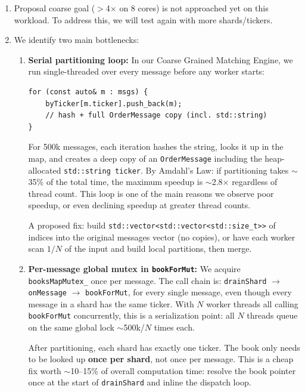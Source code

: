 \documentclass[11pt]{article}
\begin{document}
\begin{enumerate}
    \item Proposal coarse goal ($>$4$\times$ on 8 cores) is not approached yet on this workload. To address this, we will test again with more shards/tickers.

    \item We identify two main bottlenecks:

    \begin{enumerate}[label=\alph*)]
        \item \textbf{Serial partitioning loop:} In our Coarse Grained Matching Engine, we run single-threaded over every message before any worker starts:
        \begin{lstlisting}
for (const auto& m : msgs) {
    byTicker[m.ticker].push_back(m);
    // hash + full OrderMessage copy (incl. std::string)
}
        \end{lstlisting}
        For 500k messages, each iteration hashes the string, looks it up in the map, and creates a deep copy of an \texttt{OrderMessage} including the heap-allocated \texttt{std::string ticker}. By Amdahl's Law: if partitioning takes $\sim$35\% of the total time, the maximum speedup is $\sim$2.8$\times$ regardless of thread count. This loop is one of the main reasons we observe poor speedup, or even declining speedup at greater thread counts.

        A proposed fix: build \texttt{std::vector<std::vector<std::size\_t>{}>} of indices into the original messages vector (no copies), or have each worker scan $1/N$ of the input and build local partitions, then merge.

        \item \textbf{Per-message global mutex in \texttt{bookForMut}:} We acquire \texttt{booksMapMutex\_} once per message. The call chain is: \texttt{drainShard} $\rightarrow$ \texttt{onMessage} $\rightarrow$ \texttt{bookForMut}, for every single message, even though every message in a shard has the same ticker. With $N$ worker threads all calling \texttt{bookForMut} concurrently, this is a serialization point: all $N$ threads queue on the same global lock $\sim$500k/$N$ times each.

        After partitioning, each shard has exactly one ticker. The book only needs to be looked up \textbf{once per shard}, not once per message. This is a cheap fix worth $\sim$10--15\% of overall computation time: resolve the book pointer once at the start of \texttt{drainShard} and inline the dispatch loop.
    \end{enumerate}


\end{enumerate}
\end{document}
